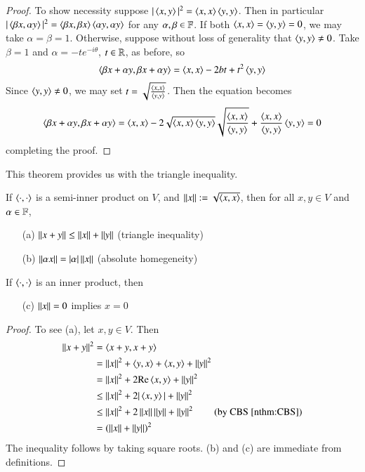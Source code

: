 \begin{proof}
    To show necessity suppose $|\left\langle x, y\right\rangle|^2 = \left\langle x, x\right\rangle\left\langle y, y\right\rangle$. Then in particular $|\left\langle \beta x, \alpha y\right\rangle|^2 = \left\langle \beta x, \beta x\right\rangle\left\langle \alpha y, \alpha y\right\rangle$ for any $\alpha,\beta \in \mathbb F$. If both $\left\langle x, x\right\rangle = \left\langle y, y\right\rangle = 0$, we may take $\alpha = \beta = 1$. Otherwise, suppose without loss of generality that $\left\langle y, y\right\rangle \neq 0$. Take $\beta = 1$ and $\alpha = -te^{-i\theta}$, $t \in \mathbb R$, as before, so $$\left\langle \beta x+\alpha y, \beta x+\alpha y\right\rangle = \left\langle x, x\right\rangle-2bt+t^2\left\langle y, y\right\rangle$$
    Since $\left\langle y, y\right\rangle \neq 0$, we may set $t = \sqrt{\frac{\left\langle x, x\right\rangle}{\left\langle y, y\right\rangle}}$. Then the equation becomes $$\left\langle \beta x+\alpha y, \beta x+\alpha y\right\rangle = \left\langle x, x\right\rangle - 2\sqrt{\left\langle x, x\right\rangle\left\langle y, y\right\rangle}\sqrt{\frac{\left\langle x, x\right\rangle}{\left\langle y, y\right\rangle}}+\frac{\left\langle x, x\right\rangle}{\left\langle y, y\right\rangle}\left\langle y, y\right\rangle = 0$$
    completing the proof.
\end{proof}

This theorem provides us with the triangle inequality.

\begin{cor}
    If $\left\langle \cdot, \cdot\right\rangle$ is a semi-inner product on $V$, and $\left|\left| x\right|\right| := \sqrt{\left\langle x, x\right\rangle}$, then for all $x,y \in V$ and $\alpha \in \mathbb F$, \begin{enumerate}
        \item[(a)] $\left|\left| x+y\right|\right| \leq \left|\left| x\right|\right|+\left|\left| y\right|\right|$ (triangle inequality)
        \item[(b)] $\left|\left| \alpha x\right|\right| = |\alpha|\left|\left| x\right|\right|$ (absolute homegeneity)
    \end{enumerate}
    If $\left\langle \cdot, \cdot\right\rangle$ is an inner product, then \begin{enumerate}
        \item[(c)] $\left|\left| x\right|\right|  = 0$ implies $ x =0$
    \end{enumerate}
\end{cor}
\begin{proof}
    To see (a), let $x,y \in V$. Then \begin{align*}
        \norm{x+y}^2 &= \inner{x+y}{x+y} \\
        &= \norm{x}^2+\inner{y}{x}+\inner{x}{y} + \norm{y}^2 \\
        &= \norm{x}^2 + 2\text{Re}\inner{x}{y} + \norm{y}^2 \\
        &\leq \norm{x}^2 + 2|\inner{x}{y}| + \norm{y}^2 \\
        &\leq \norm{x}^2 + 2\norm{x}\norm{y}+\norm{y}^2 \tag{by CBS \ref{nthm:CBS}} \\
        &= (\norm{x}+\norm{y})^2
    \end{align*}
    The inequality follows by taking square roots. (b) and (c) are immediate from definitions.
\end{proof}

